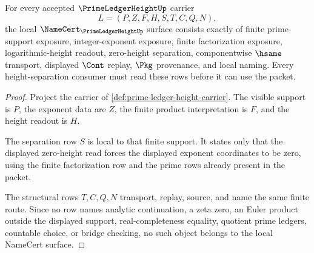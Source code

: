 \begin{theorem}
\label{thm:prime-ledger-height-namecert-obligations}
For every accepted $\PrimeLedgerHeightUp$ carrier
$$
L=(P,Z,F,H,S,T,C,Q,N),
$$
the local $\NameCert_{\PrimeLedgerHeightUp}$ surface consists exactly of finite prime-support exposure, integer-exponent exposure, finite factorization exposure, logarithmic-height readout, zero-height separation, componentwise $\hsame$ transport, displayed $\Cont$ replay, $\Pkg$ provenance, and local naming. Every height-separation consumer must read these rows before it can use the packet.
\end{theorem}
\begin{proof}
Project the carrier of \autoref{def:prime-ledger-height-carrier}. The visible support is $P$, the exponent data are $Z$, the finite product interpretation is $F$, and the height readout is $H$.

The separation row $S$ is local to that finite support. It states only that the displayed zero-height read forces the displayed exponent coordinates to be zero, using the finite factorization row and the prime rows already present in the packet.

The structural rows $T,C,Q,N$ transport, replay, source, and name the same finite route. Since no row names analytic continuation, a zeta zero, an Euler product outside the displayed support, real-completeness equality, quotient prime ledgers, countable choice, or bridge checking, no such object belongs to the local NameCert surface.
\end{proof}

